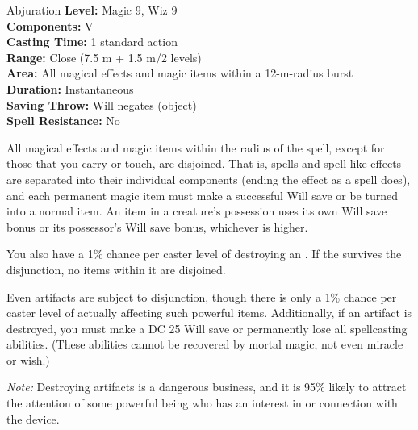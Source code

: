 {Abjuration}
{
	\textbf{Level:}
	Magic 9, Wiz 9\\
	\textbf{Components:}
	V\\
	\textbf{Casting Time:}
	1 standard action\\
	\textbf{Range:}
	Close (7.5 m + 1.5 m/2 levels)\\
	\textbf{Area:}
	All magical effects and magic items within a 12-m-radius burst\\
	\textbf{Duration:}
	Instantaneous\\
	\textbf{Saving Throw:}
	Will negates (object)\\
	\textbf{Spell Resistance:}
	No\\
}
{
	All magical effects and magic items within the radius of the spell, except for those that you carry or touch, are disjoined. That is, spells and spell-like effects are separated into their individual components (ending the effect as a  spell does), and each permanent magic item must make a successful Will save or be turned into a normal item. An item in a creature's possession uses its own Will save bonus or its possessor's Will save bonus, whichever is higher.

	You also have a 1\% chance per caster level of destroying an . If the  survives the disjunction, no items within it are disjoined.

	Even artifacts are subject to disjunction, though there is only a 1\% chance per caster level of actually affecting such powerful items. Additionally, if an artifact is destroyed, you must make a DC 25 Will save or permanently lose all spellcasting abilities. (These abilities cannot be recovered by mortal magic, not even miracle or wish.)

	\textit{Note:} Destroying artifacts is a dangerous business, and it is 95\% likely to attract the attention of some powerful being who has an interest in or connection with the device.

}
